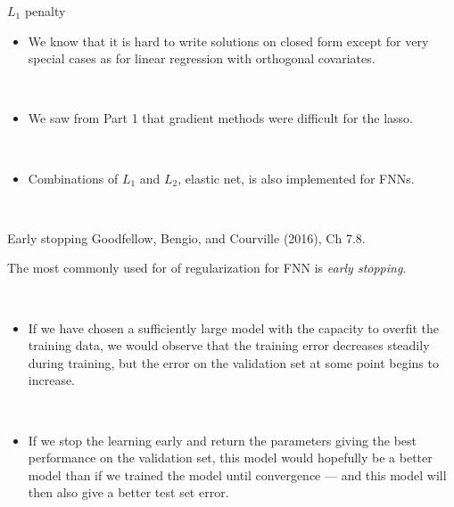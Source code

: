 \documentclass[
  ignorenonframetext,
]{beamer}
\providecommand{\tightlist}{%
  \setlength{\itemsep}{0pt}\setlength{\parskip}{0pt}}
\begin{document}
\begin{frame}
\begin{block}{\(L_1\) penalty}
\protect\hypertarget{l_1-penalty}{}
\(~\)

\begin{itemize}
\tightlist
\item
  We know that it is hard to write solutions on closed form except for
  very special cases as for linear regression with orthogonal
  covariates.
\end{itemize}

\(~\)

\begin{itemize}
\tightlist
\item
  We saw from Part 1 that gradient methods were difficult for the lasso.
\end{itemize}

\(~\)

\begin{itemize}
\tightlist
\item
  Combinations of \(L_1\) and \(L_2\), elastic net, is also implemented
  for FNNs.
\end{itemize}

\(~\)
\end{block}
\end{frame}

\begin{frame}
\begin{block}{Early stopping}
\protect\hypertarget{early-stopping}{}
Goodfellow, Bengio, and Courville (2016), Ch 7.8.

The most commonly used for of regularization for FNN is \emph{early
stopping}.

\(~\)

\begin{itemize}
\tightlist
\item
  If we have chosen a sufficiently large model with the capacity to
  overfit the training data, we would observe that the training error
  decreases steadily during training, but the error on the validation
  set at some point begins to increase.
\end{itemize}

\(~\)

\begin{itemize}
\tightlist
\item
  If we stop the learning early and return the parameters giving the
  best performance on the validation set, this model would hopefully be
  a better model than if we trained the model until convergence --- and
  this model will then also give a better test set error.
\end{itemize}

\(~\)
\end{block}
\end{frame}
\end{document}
